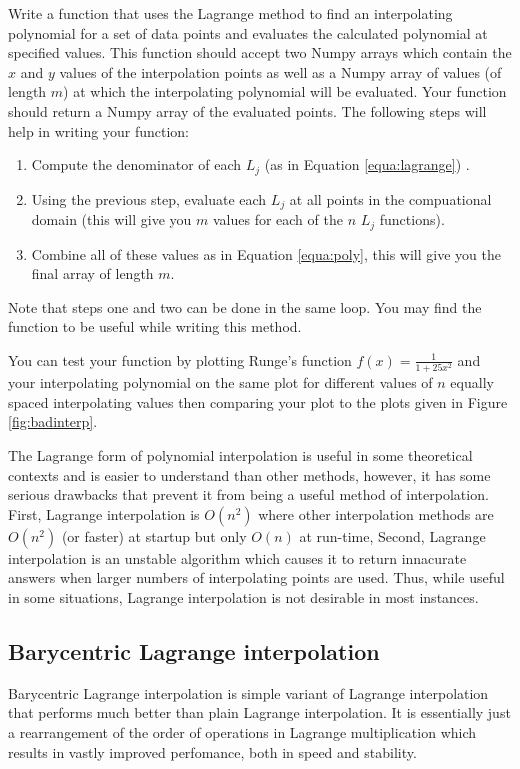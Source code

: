 \begin{problem}
Write a function that uses the Lagrange method to find an interpolating polynomial for a set of data points and evaluates the calculated polynomial at specified values.
This function should accept two Numpy arrays which contain the $x$ and $y$ values of the interpolation points as well as a Numpy array of values (of length $m$) at which the interpolating polynomial 
will be evaluated.
Your function should return a Numpy array of the evaluated points.
The following steps will help in writing your function:
\begin{enumerate}
\item Compute the denominator of each $L_j$ (as in Equation \ref{equa:lagrange}) .
\item Using the previous step, evaluate each $L_j$ at all points in the compuational domain (this will give you $m$ values for each of the $n$ $L_j$ functions).
\item Combine all of these values as in Equation \ref{equa:poly}, this will give you the final array of length $m$.
\end{enumerate}
Note that steps one and two can be done in the same loop.
You may find the function  to be useful while writing this method.

You can test your function by plotting Runge's function $f(x)=\frac{1}{1+25x^2}$ and your interpolating polynomial on the same plot for different values of $n$ equally spaced interpolating values then comparing 
your plot to the plots given in Figure \ref{fig:badinterp}.
\label{prob:lagrange}
\end{problem}

The Lagrange form of polynomial interpolation is useful in some theoretical contexts and is easier to understand than other methods, however, it has some serious drawbacks that prevent it from being a 
useful method of interpolation.
First, Lagrange interpolation is $O(n^2)$ where other interpolation methods are $O(n^2)$ (or faster) at startup but only $O(n)$ at run-time, 
Second, Lagrange interpolation is an unstable algorithm which causes it to return innacurate answers when larger numbers of interpolating points are used.
Thus, while useful in some situations, Lagrange interpolation is not desirable in most instances.

\subsection*{Barycentric Lagrange interpolation}
Barycentric Lagrange interpolation is simple variant of Lagrange interpolation that performs much better than plain Lagrange interpolation.  
It is essentially just a rearrangement of the order of operations in Lagrange multiplication which results in vastly improved perfomance, both in speed and stability.

